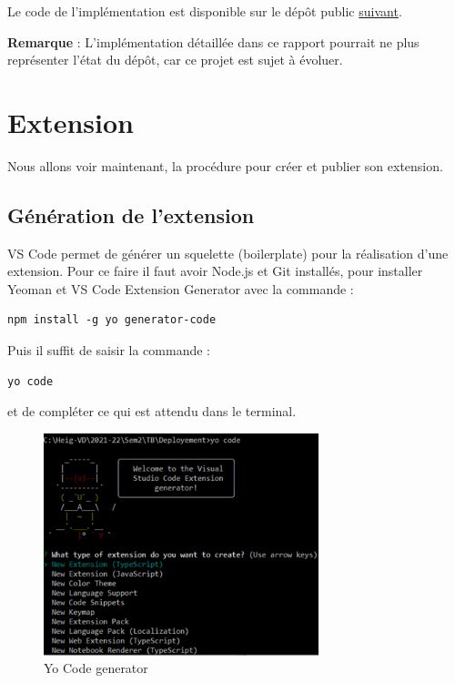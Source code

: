 \documentclass[
    iict, %
    il, %
]{heig-tb}
\begin{document}
Le code de l'implémentation est disponible sur le dépôt public \href{https://github.com/vitorva/vscode-uon}{suivant}.

\textbf{Remarque} : L'implémentation détaillée dans ce rapport pourrait ne plus représenter l'état du dépôt, car ce projet est sujet à évoluer.

\section{Extension}
Nous allons voir maintenant, la procédure pour créer et publier son extension.


\subsection{Génération de l'extension}

VS Code permet de générer un squelette (boilerplate) pour la réalisation d'une extension. Pour ce faire il faut avoir Node.js et Git installés, pour installer Yeoman et VS Code Extension Generator avec la commande :


\begin{lstlisting}[frame=single,caption={generator-code},label={generator-code}]
npm install -g yo generator-code
\end{lstlisting}

Puis il suffit de saisir la commande :

\begin{lstlisting}[frame=single]
yo code
\end{lstlisting}

et de compléter ce qui est attendu dans le terminal.

\begin{figure}[!h]
    \begin{center}
        \includegraphics[width=8cm]{assets/figures/yo-code.png}
    \end{center}
    \caption[Yo Code generator]{\label{yo-code}Yo Code generator}
\end{figure}
\end{document}
